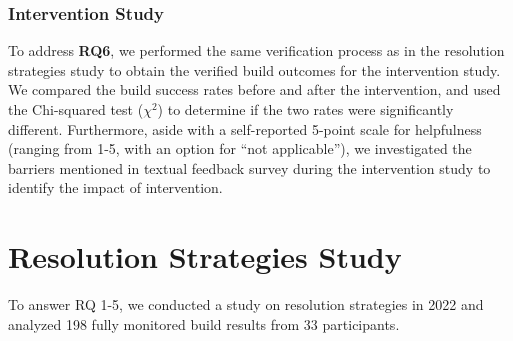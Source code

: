 \documentclass[10pt, conference]{IEEEtran}
\begin{document}
\subsubsection{Intervention Study}
To address \textbf{RQ6}, we performed the same verification process as in the resolution strategies study to obtain the verified build outcomes for the intervention study. We compared the build success rates before and after the intervention, and used the Chi-squared test ($\chi^2$) to determine if the two rates were significantly different. Furthermore, aside with a self-reported 5-point scale for helpfulness (ranging from 1-5, with an option for ``not applicable''), we investigated the barriers mentioned in textual feedback survey during the intervention study to identify the impact of intervention.


\begin{table}[tbp]
  \centering

  \caption{OSS projects in resolution strategies study}
  \vspace{-.2cm}
    \vspace{-.4cm}
  \label{tab:project}%
\end{table}%

\section{Resolution Strategies Study}
\label{sec:results22}
To answer RQ 1-5, we conducted a study on resolution strategies in 2022 and analyzed 198 fully monitored build results from 33 participants.
\end{document}
